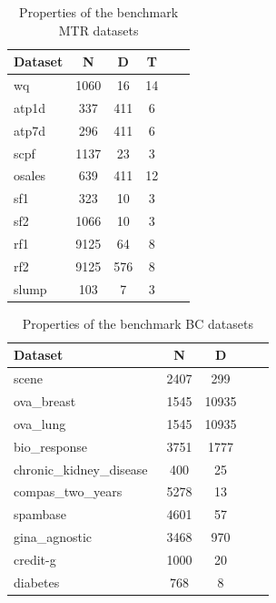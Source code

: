 \documentclass[3p,review,authoryear]{elsarticle}
\begin{document}
\begin{table}[h!]
\centering
\caption{Properties of the benchmark MTR datasets}
\label{tab:mtr}
\begin{tabular}{@{}lccccc@{}}
\toprule
\textbf{Dataset}   & \textbf{N} & \textbf{D} & \textbf{T}     \\ \midrule
wq~\citep{openml}                  & 1060         & 16         & 14 \\
atp1d~\citep{openml}               &       337         & 411   &  6     \\
atp7d~\citep{openml}                   & 296         & 411       &  6    \\
scpf~\citep{openml}                   & 1137         & 23       &  3  \\
osales~\citep{openml}                   & 639         & 411   &  12  \\
sf1~\citep{openml}             &  323        & 10       &  3   \\
sf2~\citep{openml}                & 1066         & 10     & 3  \\
rf1~\citep{openml}                  & 9125         & 64       &  8    \\
rf2~\citep{openml}           &  9125        & 576       &  8   \\
slump~\citep{openml}       & 103         & 7   &  3    \\ \bottomrule
\end{tabular}
\end{table}

\begin{table}[h!]
\centering
\caption{Properties of the benchmark BC datasets}
\label{tab:str}
\begin{tabular}{@{}lcccc@{}}
\toprule
\textbf{Dataset}   & \textbf{N} & \textbf{D} \\ \midrule
scene~\citep{mulan}                  & 2407         & 299          \\
ova\_breast~\citep{openml}                     & 1545         & 10935          \\
ova\_lung~\citep{openml}                   & 1545         & 10935             \\
bio\_response~\citep{openml}                   & 3751         & 1777          \\
chronic\_kidney\_disease~\citep{openml}                   & 400         & 25       \\
compas\_two\_years~\citep{openml}             &  5278        & 13          \\
spambase~\citep{openml}                & 4601         & 57        \\
gina\_agnostic~\citep{openml}                  & 3468         & 970             \\
credit-g~\citep{openml}           & 1000         & 20            \\
diabetes\citep{openml}       & 768         & 8         \\ \bottomrule
\end{tabular}
\end{table}
\end{document}
